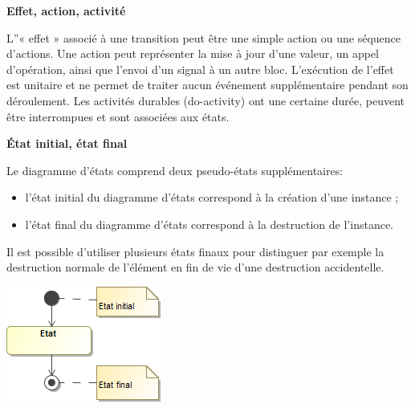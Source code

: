 \documentclass[10pt]{article}
\begin{document}
\begin{defi}
\textbf{Effet, action, activité}

L''« effet » associé à une transition peut être une simple action ou une
séquence d’actions. Une action peut représenter la mise à jour d’une valeur, un appel d’opération,
ainsi que l’envoi d’un signal à un autre bloc. L’exécution de l’effet est unitaire et ne permet de traiter
aucun événement supplémentaire pendant son déroulement. Les activités durables (do-activity)
ont une certaine durée, peuvent être interrompues et sont associées aux états.

\end{defi}


\begin{defi}
\begin{minipage}[c]{.7\linewidth}
\textbf{État initial, état final}

Le diagramme d’états comprend deux pseudo-états supplémentaires:
\begin{itemize}
\item l’état initial du diagramme d’états correspond à la création d’une instance ;
\item l’état final du diagramme d’états correspond à la destruction de l’instance.
\end{itemize}

Il est possible d’utiliser plusieurs états finaux pour distinguer par
exemple la destruction normale de l’élément en fin de vie d’une destruction accidentelle.

\end{minipage} \hfill
\begin{minipage}[c]{.25 \linewidth}
\begin{center}
\includegraphics[width=\textwidth]{images/Etat_ini_fin}
\end{center}
\end{minipage}
\end{defi}
\end{document}
